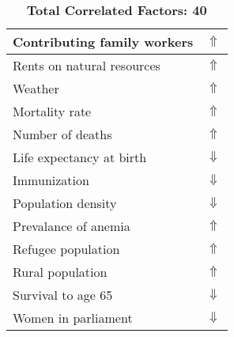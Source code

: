 \documentclass[12pt,notitlepage,oneside]{report}
\begin{document}
\begin{table}[!htb]
\begin{tabular}{|l|l|}
Contributing family workers & $\Uparrow$\\ \hline
Rents on natural resources & $\Uparrow$\\ \hline
Weather & $\Uparrow$\\ \hline
Mortality rate & $\Uparrow$\\ \hline
Number of deaths & $\Uparrow$\\ \hline
Life expectancy at birth & $\Downarrow$\\ \hline
Immunization & $\Downarrow$\\ \hline
Population density & $\Downarrow$\\ \hline
Prevalance of anemia & $\Uparrow$\\ \hline
Refugee population & $\Uparrow$\\ \hline
Rural population & $\Uparrow$\\ \hline
Survival to age 65 & $\Downarrow$\\ \hline
Women in parliament & $\Downarrow$\\ \hline
\end{tabular}
\caption*{\textbf{Total Correlated Factors: 40}}
\end{table}
\clearpage
\end{document}
